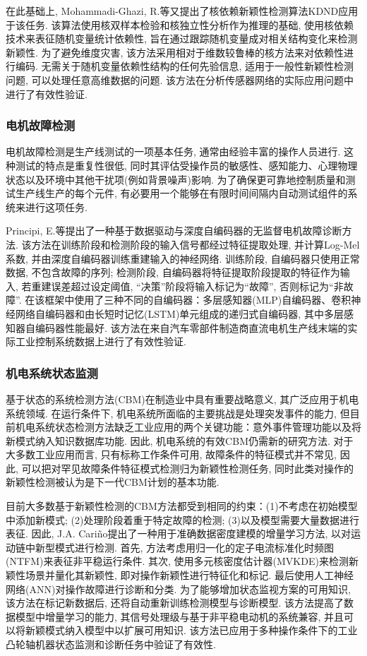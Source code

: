 \documentclass{Style/aas}
\begin{document}
\begin{multicols}{2}
  在此基础上, Mohammadi-Ghazi, R.等\cite{mohammadi2020kernel}又提出了核依赖新颖性检测算法KDND应用于该任务. 该算法使用核双样本检验和核独立性分析作为推理的基础, 使用核依赖技术来表征随机变量统计依赖性, 旨在通过跟踪随机变量成对相关结构变化来检测新颖性. 为了避免维度灾害, 该方法采用相对于维数较鲁棒的核方法来对依赖性进行编码. 无需关于随机变量依赖性结构的任何先验信息, 适用于一般性新颖性检测问题, 可以处理任意高维数据的问题. 该方法在分析传感器网络的实际应用问题中进行了有效性验证.

  \subsubsection{电机故障检测}
  电机故障检测是生产线测试的一项基本任务, 通常由经验丰富的操作人员进行. 这种测试的特点是重复性很低, 同时其评估受操作员的敏感性、感知能力、心理物理状态以及环境中其他干扰项(例如背景噪声)影响. 为了确保更可靠地控制质量和测试生产线生产的每个元件, 有必要用一个能够在有限时间间隔内自动测试组件的系统来进行这项任务\cite{principi2019unsupervised}.

  Principi, E.等\cite{principi2019unsupervised}提出了一种基于数据驱动与深度自编码器的无监督电机故障诊断方法. 该方法在训练阶段和检测阶段的输入信号都经过特征提取处理, 并计算Log-Mel系数, 并由深度自编码器训练重建输入的神经网络. 训练阶段, 自编码器只使用正常数据, 不包含故障的序列; 检测阶段, 自编码器将特征提取阶段提取的特征作为输入, 若重建误差超过设定阈值, “决策”阶段将输入标记为“故障”, 否则标记为“非故障”. 在该框架中使用了三种不同的自编码器：多层感知器(MLP)自编码器、卷积神经网络自编码器和由长短时记忆(LSTM)单元组成的递归式自编码器, 其中多层感知器自编码器性能最好. 该方法在来自汽车零部件制造商直流电机生产线末端的实际工业控制系统数据上进行了有效性验证.


  \subsubsection{机电系统状态监测}
  基于状态的系统检测方法(CBM)在制造业中具有重要战略意义, 其广泛应用于机电系统领域. 在运行条件下, 机电系统所面临的主要挑战是处理突发事件的能力, 但目前机电系统状态检测方法缺乏工业应用的两个关键功能：意外事件管理功能以及将新模式纳入知识数据库功能. 因此, 机电系统的有效CBM仍需新的研究方法. 对于大多数工业应用而言, 只有标称工作条件可用, 故障条件的特征模式并不常见\cite{carino2020incremental}, 因此, 可以把对罕见故障条件特征模式检测归为新颖性检测任务, 同时此类对操作的新颖性检测被认为是下一代CBM计划的基本功能.

  目前大多数基于新颖性检测的CBM方法都受到相同的约束：(1)不考虑在初始模型中添加新模式; (2)处理阶段着重于特定故障的检测; (3)以及模型需要大量数据进行表征. 因此, J.A. Cariño\cite{carino2020incremental}提出了一种用于准确数据密度建模的增量学习方法, 以对运动链中新型模式进行检测. 首先, 方法考虑用归一化的定子电流标准化时频图(NTFM)来表征非平稳运行条件. 其次, 使用多元核密度估计器(MVKDE)来检测新颖性场景并量化其新颖性, 即对操作新颖性进行特征化和标记. 最后使用人工神经网络(ANN)对操作故障进行诊断和分类. 为了能够增加状态监视方案的可用知识, 该方法在标记新数据后, 还将自动重新训练检测模型与诊断模型. 该方法提高了数据模型中增量学习的能力, 其信号处理级与基于非平稳电动机的系统兼容, 并且可以将新颖模式纳入模型中以扩展可用知识. 该方法已应用于多种操作条件下的工业凸轮轴机器状态监测和诊断任务中验证了有效性.



\end{multicols}
\end{document}
